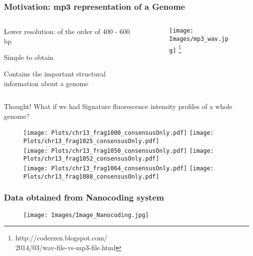 \documentclass[10pt,dvipsnames,table]{beamer}
\begin{document}
\begin{frame}
\frametitle{Motivation: mp3 representation of a Genome}
\vspace{-0.8cm}
\begin{columns}[t]
\begin{column}{0.6\textwidth}
\begin{itemize} {\small{
\item Lower resolution: of the order of 400 - 600 bp
\item Simple to obtain
\item Contains the important structural information about a genome
}}
\end{itemize}
\end{column}

\begin{column}{0.4\textwidth}
\begin{figure}[t]
\texttt{[image: Images/mp3\_wav.jpg]} \footnote{\tiny{http://coderzen.blogspot.com/ \\ 2014/03/wav-file-vs-mp3-file.html}}
\end{figure}

\end{column}
\end{columns}
\begin{block}{Thought!}
What if we had Signature fluorescence intensity profiles of a whole genome?
\end{block}

\vspace{-0.2cm}
\begin{figure}[H]
\texttt{[image: Plots/chr13\_frag1000\_consensusOnly.pdf]}
\hspace{0.5cm}
\texttt{[image: Plots/chr13\_frag1025\_consensusOnly.pdf]} \\
\texttt{[image: Plots/chr13\_frag1050\_consensusOnly.pdf]}
\hspace{0.5cm}
\texttt{[image: Plots/chr13\_frag1052\_consensusOnly.pdf]} \\
\texttt{[image: Plots/chr13\_frag1064\_consensusOnly.pdf]}
\hspace{0.5cm}
\texttt{[image: Plots/chr13\_frag1088\_consensusOnly.pdf]}
\end{figure}

\note{}
\end{frame}

\begin{frame}
\frametitle{Data obtained from Nanocoding system}
\begin{figure}[T]
\texttt{[image: Images/Image\_Nanocoding.jpg]}
\end{figure}

\note{}
\end{frame}
\end{document}
